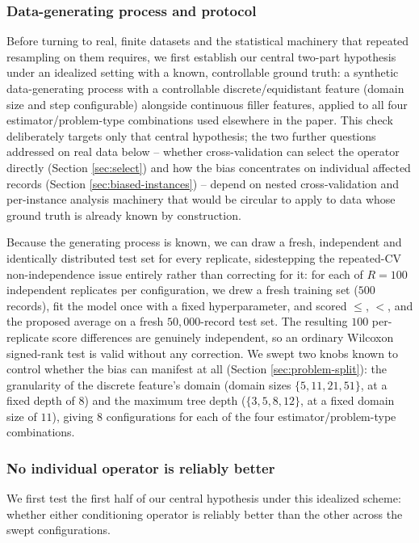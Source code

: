 \documentclass[5p,twocolumn,authoryear]{elsarticle}
\theoremstyle{plain}%
\theoremstyle{remark}%
\theoremstyle{definition}%
\begin{document}
\subsubsection{Data-generating process and protocol}

Before turning to real, finite datasets and the statistical machinery that repeated resampling on them requires, we first establish our central two-part hypothesis under an idealized setting with a known, controllable ground truth: a synthetic data-generating process with a controllable discrete/equidistant feature (domain size and step configurable) alongside continuous filler features, applied to all four estimator/problem-type combinations used elsewhere in the paper. This check deliberately targets only that central hypothesis; the two further questions addressed on real data below -- whether cross-validation can select the operator directly (Section \ref{sec:select}) and how the bias concentrates on individual affected records (Section \ref{sec:biased-instances}) -- depend on nested cross-validation and per-instance analysis machinery that would be circular to apply to data whose ground truth is already known by construction.

Because the generating process is known, we can draw a fresh, independent and identically distributed test set for every replicate, sidestepping the repeated-CV non-independence issue entirely rather than correcting for it: for each of $R=100$ independent replicates per configuration, we drew a fresh training set ($500$ records), fit the model once with a fixed hyperparameter, and scored $\leq$, $<$, and the proposed average on a fresh $50{,}000$-record test set. The resulting $100$ per-replicate score differences are genuinely independent, so an ordinary Wilcoxon signed-rank test is valid without any correction. We swept two knobs known to control whether the bias can manifest at all (Section \ref{sec:problem-split}): the granularity of the discrete feature's domain (domain sizes $\{5,11,21,51\}$, at a fixed depth of $8$) and the maximum tree depth ($\{3,5,8,12\}$, at a fixed domain size of $11$), giving $8$ configurations for each of the four estimator/problem-type combinations.


\subsubsection{No individual operator is reliably better}

We first test the first half of our central hypothesis under this idealized scheme: whether either conditioning operator is reliably better than the other across the swept configurations.
\end{document}
